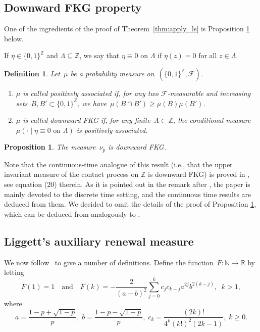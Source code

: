 \documentclass[a4paper,12pt]{article}
\newtheorem  {proposition}   [theorem]{Proposition}
\newtheorem  {definition}    [theorem]{Definition}
\newcommand{\Z}{\mathbb{Z}}
\begin{document}
\subsection{Downward FKG property}
One of the ingredients of the proof of Theorem~\ref{thm:apply_ls} is Proposition \ref{prop:vdb} below.

If $\eta \in \{0,1\}^{\mathbb{Z}}$ and $\Lambda \subseteq \mathbb{Z}$,  we say that $\eta \equiv 0$ on $\Lambda$ if $\eta(z)=0$ for all $z \in \Lambda$.
\begin{definition}\label{downward_fkg}
 Let~$\mu$ be a probability measure on~$(\{0,1\}^{\Z}, \mathcal{F})$.
\begin{enumerate}
\item $\mu$ is called \emph{positively associated} if, for any two $\mathcal{F}$-measurable and increasing sets~$B, B' \subset \{0,1\}^{\Z}$, we have~$\mu(B \cap B') \ge \mu(B) \mu(B')$.
\item $\mu$ is called \emph{downward FKG} if, for any finite~$\Lambda \subset {\Z}$, the conditional measure~$\mu(\cdot \mid \eta \equiv 0 \text{ on } \Lambda)$ is positively associated.
\end{enumerate}
\end{definition}
\begin{proposition}\label{prop:vdb}
The  measure~$\nu_p$   is downward FKG.
\end{proposition}
Note that the continuous-time analogue of this result (i.e., that the upper invariant measure of the contact process on $\mathbb{Z}$ is downward FKG) is
proved in \cite{vdBHK06}, see equation (20) therein.  As it is pointed out in the remark after \cite[Theorem 2.1]{LS06}, the paper \cite{vdBHK06} is mainly devoted to the discrete time setting, and the continuous time results are deduced from them.
We decided to omit the details of the proof of Proposition \ref{prop:vdb}, which can be deduced from \cite[Theorem 3.1]{vdBHK06} analogously to \cite[(20)]{vdBHK06}.





\subsection{Liggett's auxiliary renewal measure}\label{subsect_liggett_renewal}

We now follow~\cite{Li95} to give a number of definitions. Define the function~$F:\mathbb{N} \to \mathbb{R}$ by letting
$$F(1) =  1 \quad \text{and}\quad F(k) = -\frac{2}{(a-b)^2}\sum_{j=0}^k c_j c_{k-j}a^{2j}b^{2(k-j)},\;\;k > 1,$$
where
\begin{equation} \label{a_b_c_k}
a = \frac{1-p+\sqrt{1-p}}{p},\;
 b= \frac{1-p-\sqrt{1-p}}{p},\;
  c_k = \frac{(2k)!}{4^k(k!)^2(2k-1)},\; k \geq 0.
\end{equation}
\end{document}
